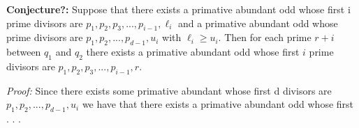 \documentclass[../paper.tex]{subfiles}
\begin{document}
 



% 







\textbf{Conjecture?:} Suppose that there exists a primative abundant
odd whose first i prime divisors are $p_1, p_2, p_3, ..., p_{i-1}, 
\ell_i$ and a primative abundant odd whose prime divisors are $p_1, p_2, 
..., p_{d-1}, u_i$ with $\ell_i \geq u_i$. Then for each prime $r+i$ 
between $q_1$ and $q_2$ there exists a primative abundant odd whose 
first $i$ prime divisors are $p_1, p_2, p_3, ..., p_{i-1}, r$.

\textit{Proof:} 
%
Since there exists some primative abundant whose first d divisors
are $p_1, p_2, ..., p_{d-1}, u_i$ we have that there exists a primative
abundant odd whose first 
.
.
.
\end{document}
